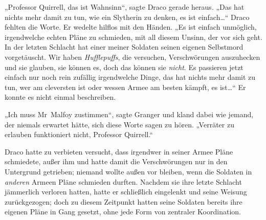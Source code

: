 „Professor Quirrell, das ist Wahnsinn“, sagte Draco gerade heraus. „Das hat nichts mehr damit zu tun, wie ein Slytherin zu denken, es ist einfach…“ Draco fehlten die Worte. Er wedelte hilflos mit den Händen. „Es ist einfach unmöglich, irgendwelche echten Pläne zu schmieden, mit all diesem Unsinn, der vor sich geht. In der letzten Schlacht hat einer meiner Soldaten seinen eigenen Selbstmord vorgetäuscht. Wir haben \emph{Hufflepuffs}, die versuchen, Verschwörungen auszuhecken und sie glauben, sie können es, doch das können sie \emph{nicht}. Es passieren jetzt einfach nur noch rein zufällig irgendwelche Dinge, das hat nichts mehr damit zu tun, wer am cleversten ist oder wessen Armee am besten kämpft, es ist…“ Er konnte es nicht einmal beschreiben.

„Ich muss Mr~Malfoy zustimmen“, sagte Granger und kland dabei wie jemand, der niemals erwartet hätte, sich diese Worte sagen zu hören. „Verräter zu erlauben funktioniert nicht, Professor Quirrell.“

Draco hatte zu verbieten versucht, dass irgendwer in seiner Armee Pläne schmiedete, außer ihm und hatte damit die Verschwörungen nur in den Untergrund getrieben; niemand wollte außen vor bleiben, wenn die Soldaten in \emph{anderen} Armeen Pläne schmieden durften. Nachdem sie ihre letzte Schlacht jämmerlich verloren hatten, hatte er schließlich eingelenkt und seine Weisung zurückgezogen; doch zu diesem Zeitpunkt hatten seine Soldaten bereits ihre eigenen Pläne in Gang gesetzt, ohne jede Form von zentraler Koordination.

